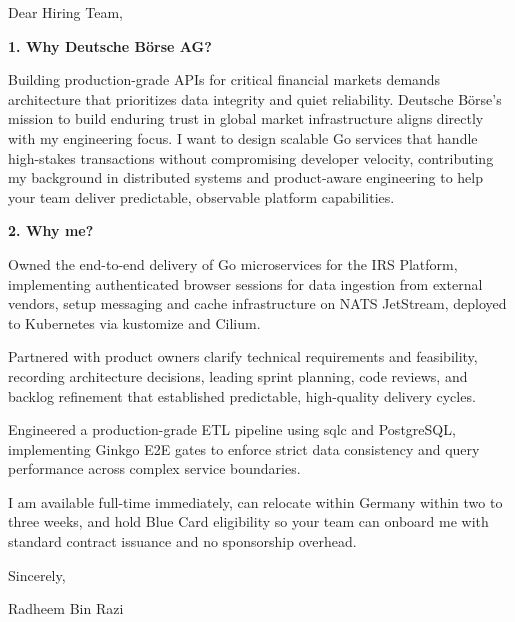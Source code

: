 \documentclass[11pt,a4paper]{coverletter}
\begin{document}

\opening{Dear Hiring Team,}

\vspace{8pt}\noindent\textbf{1. Why Deutsche Börse AG?}\par\vspace{3pt}

Building production-grade APIs for critical financial markets demands architecture that prioritizes data integrity and quiet reliability. Deutsche Börse’s mission to build enduring trust in global market infrastructure aligns directly with my engineering focus. I want to design scalable Go services that handle high-stakes transactions without compromising developer velocity, contributing my background in distributed systems and product-aware engineering to help your team deliver predictable, observable platform capabilities.

\vspace{8pt}\noindent\textbf{2. Why me?}\par\vspace{3pt}

\bullets

  \item Owned the end-to-end delivery of Go microservices for the IRS Platform, implementing authenticated browser sessions for data ingestion from external vendors, setup messaging and cache infrastructure on NATS JetStream, deployed to Kubernetes via kustomize and Cilium.

  \item Partnered with product owners clarify technical requirements and feasibility, recording architecture decisions, leading sprint planning, code reviews, and backlog refinement that established predictable, high-quality delivery cycles.

  \item Engineered a production-grade ETL pipeline using sqlc and PostgreSQL, implementing Ginkgo E2E gates to enforce strict data consistency and query performance across complex service boundaries.

\bulletsend

I am available full-time immediately, can relocate within Germany within two to three weeks, and hold Blue Card eligibility so your team can onboard me with standard contract issuance and no sponsorship overhead.

\closing{Sincerely,}{Radheem Bin Razi}

\clearpage
{}
\end{document}
